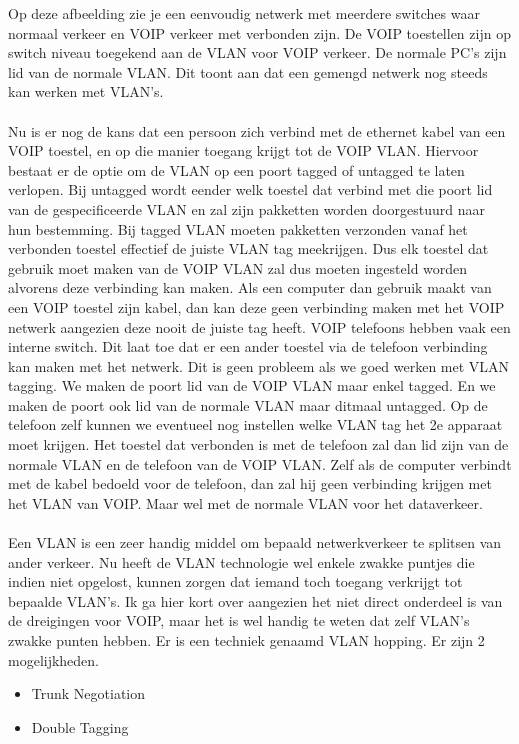 \documentclass[pdftex,a4paper,12pt,twoside]{report}
\begin{document}
Op deze afbeelding zie je een eenvoudig netwerk met meerdere switches waar normaal verkeer en VOIP verkeer met verbonden zijn. De VOIP toestellen zijn op switch niveau toegekend aan de VLAN voor VOIP verkeer. De normale PC's zijn lid van de normale VLAN. Dit toont aan dat een gemengd netwerk nog steeds kan werken met VLAN's.
\\
\\
Nu is er nog de kans dat een persoon zich verbind met de ethernet kabel van een VOIP toestel, en op die manier toegang krijgt tot de VOIP VLAN. Hiervoor bestaat er de optie om de VLAN op een poort tagged of untagged te laten verlopen. Bij untagged wordt eender welk toestel dat verbind met die poort lid van de gespecificeerde VLAN en zal zijn pakketten worden doorgestuurd naar hun bestemming. Bij tagged VLAN moeten pakketten verzonden vanaf het verbonden toestel effectief de juiste VLAN tag meekrijgen. Dus elk toestel dat gebruik moet maken van de VOIP VLAN zal dus moeten ingesteld worden alvorens deze verbinding kan maken. Als een computer dan gebruik maakt van een VOIP toestel zijn kabel, dan kan deze geen verbinding maken met het VOIP netwerk aangezien deze nooit de juiste tag heeft. \newpage
VOIP telefoons hebben vaak een interne switch. Dit laat toe dat er een ander toestel via de telefoon verbinding kan maken met het netwerk. Dit is geen probleem als we goed werken met VLAN tagging. We maken de poort lid van de VOIP VLAN maar enkel tagged. En we maken de poort ook lid van de normale VLAN maar ditmaal untagged. Op de telefoon zelf kunnen we eventueel nog instellen welke VLAN tag het 2e apparaat moet krijgen. Het toestel dat verbonden is met de telefoon zal dan lid zijn van de normale VLAN en de telefoon van de VOIP VLAN. Zelf als de computer verbindt met de kabel bedoeld voor de telefoon, dan zal hij geen verbinding krijgen met het VLAN van VOIP. Maar wel met de normale VLAN voor het dataverkeer. 
\\ \\
Een VLAN is een zeer handig middel om bepaald netwerkverkeer te splitsen van ander verkeer. Nu heeft de VLAN technologie wel enkele zwakke puntjes die indien niet opgelost, kunnen zorgen dat iemand toch toegang verkrijgt tot bepaalde VLAN's. Ik ga hier kort over aangezien het niet direct onderdeel is van de dreigingen voor VOIP, maar het is wel handig te weten dat zelf VLAN's zwakke punten hebben. Er is een techniek genaamd VLAN hopping. Er zijn 2 mogelijkheden.
\begin{itemize}
		\item{Trunk Negotiation}
		\item{Double Tagging}
\end{itemize}
\end{document}

